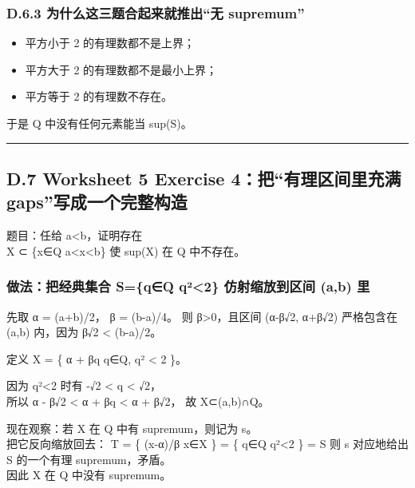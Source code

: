 \documentclass[
  11pt,
]{article}
\providecommand{\tightlist}{%
  \setlength{\itemsep}{0pt}\setlength{\parskip}{0pt}}
\begin{document}
\subsubsection{D.6.3 为什么这三题合起来就推出``无
supremum''}\label{d.6.3-ux4e3aux4ec0ux4e48ux8fd9ux4e09ux9898ux5408ux8d77ux6765ux5c31ux63a8ux51faux65e0-supremum}

\begin{itemize}
\tightlist
\item
  平方小于 2 的有理数都不是上界；
\item
  平方大于 2 的有理数都不是最小上界；
\item
  平方等于 2 的有理数不存在。
\end{itemize}

于是 Q 中没有任何元素能当 sup(S)。

\begin{center}\rule{0.5\linewidth}{0.5pt}\end{center}

\subsection{D.7 Worksheet 5 Exercise 4：把``有理区间里充满
gaps''写成一个完整构造}\label{d.7-worksheet-5-exercise-4ux628aux6709ux7406ux533aux95f4ux91ccux5145ux6ee1-gapsux5199ux6210ux4e00ux4e2aux5b8cux6574ux6784ux9020}

题目：任给 a\textless b，证明存在\\
X ⊂ \{x∈Q \textbar{} a\textless x\textless b\} 使 sup(X) 在 Q 中不存在。

\subsubsection{做法：把经典集合 S=\{q∈Q \textbar{} q²\textless2\}
仿射缩放到区间 (a,b)
里}\label{ux505aux6cd5ux628aux7ecfux5178ux96c6ux5408-sqq-quxb22-ux4effux5c04ux7f29ux653eux5230ux533aux95f4-ab-ux91cc}

先取 α = (a+b)/2， β = (b-a)/4。 则 β\textgreater0，且区间 (α-β√2,
α+β√2) 严格包含在 (a,b) 内，因为 β√2 \textless{} (b-a)/2。

定义 X = \{ α + βq \textbar{} q∈Q, q² \textless{} 2 \}。

因为 q²\textless2 时有 -√2 \textless{} q \textless{} √2，\\
所以 α - β√2 \textless{} α + βq \textless{} α + β√2， 故 X⊂(a,b)∩Q。

现在观察：若 X 在 Q 中有 supremum，则记为 s。\\
把它反向缩放回去： T = \{ (x-α)/β \textbar{} x∈X \} = \{ q∈Q \textbar{}
q²\textless2 \} = S 则 s 对应地给出 S 的一个有理 supremum，矛盾。\\
因此 X 在 Q 中没有 supremum。
\end{document}
